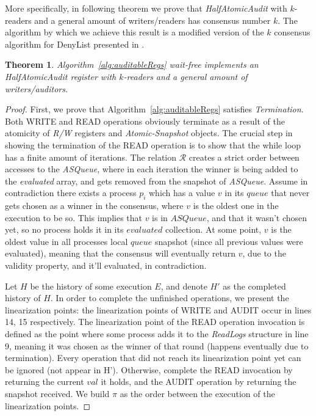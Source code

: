 \documentclass[11pt]{article}
\newtheorem{theorem}{Theorem}
\theoremstyle{definition}
\begin{document}
More specifically, in following theorem we prove that \textit{HalfAtomicAudit} with $k$-readers and a general amount of writers/readers has consensus number $k$. The algorithm by which we achieve this result is a modified version of the $k$ consensus algorithm for DenyList presented in \cite{AccessControl}.

\begin{theorem}
    Algorithm~\ref{alg:auditableRegs} wait-free implements an \textit{HalfAtomicAudit} register with $k$-readers and a general amount of writers/auditors.
\end{theorem}

\begin{proof}


First, we prove that Algorithm~\ref{alg:auditableRegs} satisfies \textit{Termination}. Both WRITE and READ operations obviously terminate as a result of the atomicity of \textit{R/W} registers and \textit{Atomic-Snapshot} objects. The crucial step in showing the termination of the READ operation is to show that the while loop has a finite amount of iterations. The relation $\mathcal{R}$ creates a strict order between accesses to the \textit{ASQueue}, where in each iteration the winner is being added to the \textit{evaluated} array, and gets removed from the snapshot of \textit{ASQueue}. Assume in contradiction there exists a process $p_i$ which has a value $v$ in its $queue$ that never gets chosen as a winner in the consensus, where $v$ is the oldest one in the execution to be so. This implies that $v$ is in $ASQueue$, and that it wasn't chosen yet, so no process holds it in its $evaluated$ collection. At some point, $v$ is the oldest value in all processes local $queue$ snapshot (since all previous values were evaluated), meaning that the consensus will eventually return $v$, due to the validity property, and it'll evaluated, in contradiction.

Let $H$ be the history of some execution $E$, and denote $H'$ as the completed history of $H$. In order to complete the unfinished operations, we present the linearization points: the linearization points of WRITE and AUDIT occur in lines 14, 15 respectively. The linearization point of the READ operation invocation is defined as the point where some process adds it to the \textit{ReadLogs} structure in line 9, meaning it was chosen as the winner of that round (happens eventually due to termination). Every operation that did not reach its linearization point yet can be ignored (not appear in H'). Otherwise, complete the READ invocation by returning the current $val$ it holds, and the AUDIT operation by returning the snapshot received. We build $\pi$ as the order between the execution of the linearization points.


\end{proof}
\end{document}
